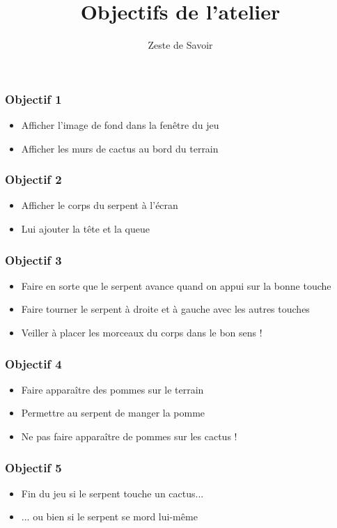 \documentclass{beamer}
\title{Objectifs de l'atelier}
\author{Zeste de Savoir}
\begin{document}
\begin{frame}
  \titlepage
\end{frame}

\begin{frame}
    \frametitle{Objectif 1}
        \begin{itemize}
            \item Afficher l'image de fond dans la fenêtre du jeu
            \item Afficher les murs de cactus au bord du terrain
        \end{itemize}
\end{frame}

\begin{frame}
    \frametitle{Objectif 2}
        \begin{itemize}
            \item Afficher le corps du serpent à l'écran
            \item Lui ajouter la tête et la queue
        \end{itemize}
\end{frame}

\begin{frame}
    \frametitle{Objectif 3}
        \begin{itemize}
            \item Faire en sorte que le serpent avance quand on appui sur la bonne touche
            \item Faire tourner le serpent à droite et à gauche avec les autres touches
            \item Veiller à placer les morceaux du corps dans le bon sens !
        \end{itemize}
\end{frame}

\begin{frame}
    \frametitle{Objectif 4}
        \begin{itemize}
            \item Faire apparaître des pommes sur le terrain
            \item Permettre au serpent de manger la pomme
            \item Ne pas faire apparaître de pommes sur les cactus !
        \end{itemize}
\end{frame}

\begin{frame}
    \frametitle{Objectif 5}
        \begin{itemize}
            \item Fin du jeu si le serpent touche un cactus...
            \item ... ou bien si le serpent se mord lui-même
        \end{itemize}
\end{frame}
\end{document}
